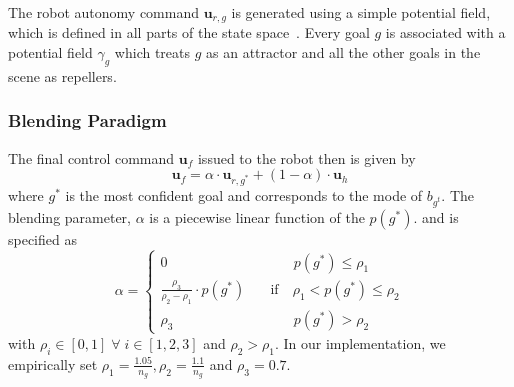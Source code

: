 \documentclass[letterpaper, 10 pt, conference]{ieeeconf}  %
\newcommand{\norm}[1]{\left\lVert#1\right\rVert}
\begin{document}
The robot autonomy command $\boldsymbol{u}_{r,g}$ is generated using a simple potential field, which is defined in all parts of the state space~\cite{khatib1986real}. Every goal $g$ is associated with a potential field $\gamma_g$ which treats $g$ as an attractor and all the other goals in the scene as repellers. 

\subsubsection{Blending Paradigm}\label{sssec:blending}
The final control command $\boldsymbol{u}_f$ issued to the robot then is given by
\begin{equation*}
	\boldsymbol{u}_f = \alpha\cdot \boldsymbol{u}_{r,g^*} + (1 - \alpha)\cdot \boldsymbol{u}_h
\end{equation*}
where $g^*$ is the most confident goal and corresponds to the mode of $b_{g^t}$. 
The blending parameter, $\alpha$ is a piecewise linear function of the $p(g^*)$.
and is specified as
$$
\alpha = \left\{
\begin{array}{ll}
0 & \quad\quad~~~ p(g^*) \leq \rho_1 \\
\frac{\rho_3}{\rho_2 - \rho_1}\cdot p(g^*) &  \quad \text{if}\quad \rho_1 < p(g^*) \leq \rho_2  \\
\rho_3 & \quad\quad~~~ p(g^*) > \rho_2 	
\end{array}
\right.
$$
with $\rho_i \in [0, 1] \;\forall\; i \in [1,2,3]$ and $ \rho_2 > \rho_1$. 
In our implementation, we empirically set $\rho_1 = \frac{1.05}{n_g}, \rho_2 = \frac{1.1}{n_g}$ and $ \rho_3 = 0.7$.
\end{document}

